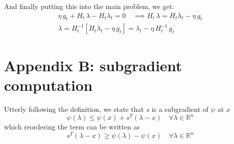 \documentclass[notitlepage]{article}
\begin{document}
And finally putting this into the main problem, we get:
\begin{gather*}
  \eta\, g_t + H_t\, \lambda - H_t \lambda_t = 0 \quad \implies H_t\, \lambda = H_t \lambda_t - \eta\, g_t \\
  \lambda = H_t^{-1} \left[ H_t \lambda_t - \eta\, g_t \right] = \lambda_t - \eta\, H_t^{-1}\, g_t
\end{gather*}


\section{Appendix B: subgradient computation}
\label{sec:appendix_B}

Utterly following the definition, we state that $s$ is a subgradient of $\psi$ at $x$
\[
  \psi( \lambda ) \le \psi(x) + s^T (\lambda - x) \quad \forall \lambda \in \mathbb{R}^n  
\]
which reordering the term can be written as
\[
  s^T (\lambda - x) \ge \psi(\lambda) - \psi(x) \quad \forall \lambda \in \mathbb{R}^n  
\]
\end{document}
